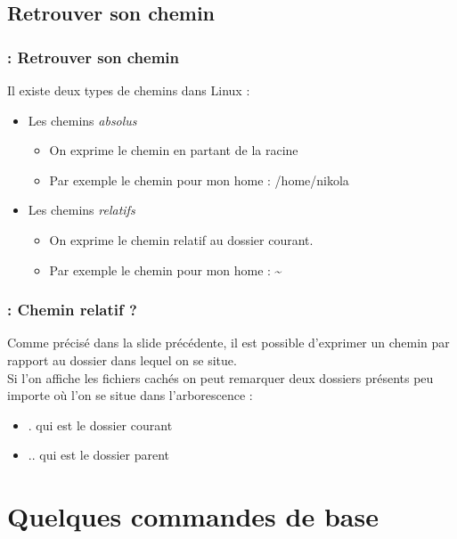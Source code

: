 \documentclass[13pt]{beamer}
\newenvironment{slide}[1]{
  \begin{frame}[environment=slide]
    \frametitle{\textbf{\insertsection}  : #1}}
{\end{frame}}
\begin{document}
\subsection{Retrouver son chemin}

\begin{slide}{Retrouver son chemin}
  Il existe deux types de chemins dans Linux :
  \begin{itemize}
  \item Les chemins \textit{absolus}
    \begin{itemize}
    \item On exprime le chemin en partant de la racine
    \item Par exemple le chemin pour mon home : /home/nikola
    \end{itemize}
  \item Les chemins \textit{relatifs}
    \begin{itemize}
    \item On exprime le chemin relatif au dossier courant.
    \item Par exemple le chemin pour mon home : \textasciitilde
    \end{itemize}
  \end{itemize}
\end{slide}

\begin{slide}{Chemin relatif ?}
  Comme précisé dans la slide précédente, il est possible d'exprimer un chemin par
  rapport au dossier dans lequel on se situe.\\

  Si l'on affiche les fichiers cachés on peut remarquer deux dossiers présents
  peu importe où l'on se situe dans l'arborescence :
  \begin{itemize}
  \item . qui est le dossier courant
  \item .. qui est le dossier parent
  \end{itemize}
\end{slide}

\section{Quelques commandes de base}
\end{document}
